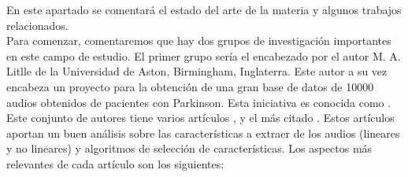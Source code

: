 \label{cap:TrabRel}

En este apartado se comentará el estado del arte de la materia y algunos trabajos relacionados.\\

Para comenzar, comentaremos que hay dos grupos de investigación importantes en este campo de estudio. El primer grupo sería el encabezado por el autor M. A. Litlle de la Universidad de Aston, Birmingham, Inglaterra. Este autor a su vez encabeza un proyecto para la obtención de una gran base de datos de 10000 audios obtenidos de pacientes con Parkinson. Esta iniciativa es conocida como . Este conjunto de autores tiene varios artículos \cite{MxLtAccurate}, \cite{MxLtNovel} y el más citado \cite{MxLtSuitability}. Estos artículos aportan un buen análisis sobre las características a extraer de los audios (lineares y no lineares) y algoritmos de selección de características. Los aspectos más relevantes de cada artículo son los siguientes:

